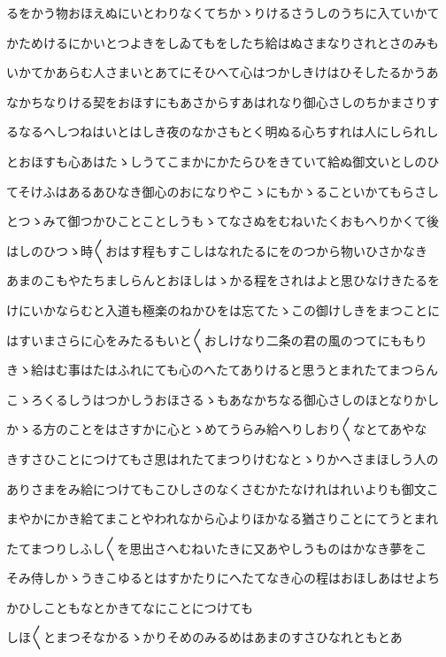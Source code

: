 \documentclass[a4paper,11pt,landscape]{ltjtarticle}
\begin{document}
るをかう物おほえぬにいとわりなくてちかゝりけるさうしのうちに入ていかて
\par\medskip
かためけるにかいとつよきをしゐてもをしたち給はぬさまなりされとさのみも
\par\medskip
いかてかあらむ人さまいとあてにそひへて心はつかしきけはひそしたるかうあ
\par\medskip
なかちなりける契をおほすにもあさからすあはれなり御心さしのちかまさりす
\par\medskip
るなるへしつねはいとはしき夜のなかさもとく明ぬる心ちすれは人にしられし
\par\medskip
とおほすも心あはたゝしうてこまかにかたらひをきていて給ぬ御文いとしのひ
\par\medskip
てそけふはあるあひなき御心のおになりやこゝにもかゝることいかてもらさし
\par\medskip
とつゝみて御つかひことことしうもゝてなさぬをむねいたくおもへりかくて後
\par\medskip
はしのひつゝ時〱おはす程もすこしはなれたるにをのつから物いひさかなき
\par\medskip
あまのこもやたちましらんとおほしはゝかる程をされはよと思ひなけきたるを
\par\medskip
けにいかならむと入道も極楽のねかひをは忘てたゝこの御けしきをまつことに
\par\medskip
はすいまさらに心をみたるもいと〱おしけなり二条の君の風のつてにももり
\par\medskip
きゝ給はむ事はたはふれにても心のへたてありけると思うとまれたてまつらん
\par\medskip
こゝろくるしうはつかしうおほさるゝもあなかちなる御心さしのほとなりかし
\par\medskip
かゝる方のことをはさすかに心とゝめてうらみ給へりしおり〱なとてあやな
\par\medskip
きすさひことにつけてもさ思はれたてまつりけむなとゝりかへさまほしう人の
\par\medskip
ありさまをみ給につけてもこひしさのなくさむかたなけれはれいよりも御文こ
\par\medskip
まやかにかき給てまことやわれなから心よりほかなる猶さりことにてうとまれ
\par\medskip
たてまつりしふし〱を思出さへむねいたきに又あやしうものはかなき夢をこ
\par\medskip
そみ侍しかゝうきこゆるとはすかたりにへたてなき心の程はおほしあはせよち
\par\medskip
かひしこともなとかきてなにことにつけても
\par\medskip
しほ〱とまつそなかるゝかりそめのみるめはあまのすさひなれともとあ
\end{document}
